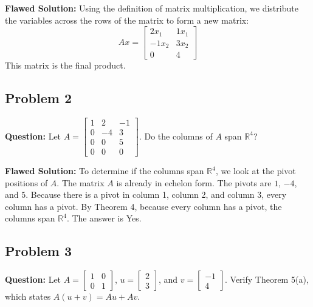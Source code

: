 \documentclass{article}
\begin{document}
\textbf{Flawed Solution:}
Using the definition of matrix multiplication, we distribute the variables across the rows of the matrix to form a new matrix:
\[ Ax = \begin{bmatrix} 2x_1 & 1x_1 \\ -1x_2 & 3x_2 \\ 0 & 4 \end{bmatrix} \]
This matrix is the final product.

\subsection{Problem 2}
\textbf{Question:} Let $A = \begin{bmatrix} 1 & 2 & -1 \\ 0 & -4 & 3 \\ 0 & 0 & 5 \\ 0 & 0 & 0 \end{bmatrix}$. Do the columns of $A$ span $\mathbb{R}^4$?

\textbf{Flawed Solution:}
To determine if the columns span $\mathbb{R}^4$, we look at the pivot positions of $A$. 
The matrix $A$ is already in echelon form.
The pivots are $1$, $-4$, and $5$. 
Because there is a pivot in column 1, column 2, and column 3, every column has a pivot. 
By Theorem 4, because every column has a pivot, the columns span $\mathbb{R}^4$. The answer is Yes.

\subsection{Problem 3}
\textbf{Question:} Let $A = \begin{bmatrix} 1 & 0 \\ 0 & 1 \end{bmatrix}$, $u = \begin{bmatrix} 2 \\ 3 \end{bmatrix}$, and $v = \begin{bmatrix} -1 \\ 4 \end{bmatrix}$. Verify Theorem 5(a), which states $A(u+v) = Au + Av$.
\end{document}
